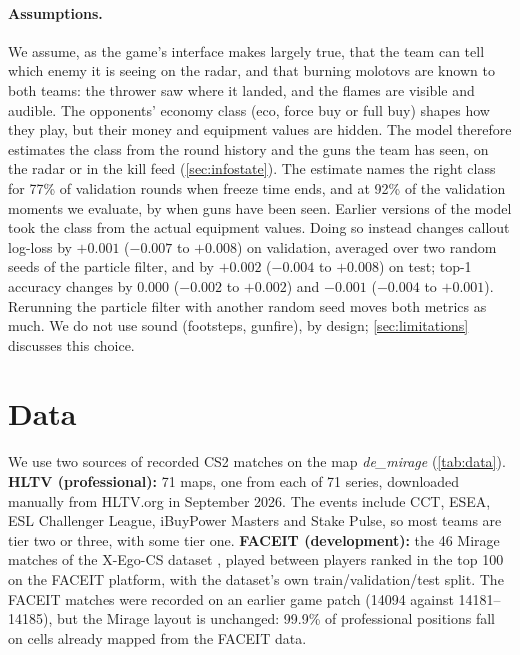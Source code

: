 \documentclass[11pt]{article}
\newcommand{\1}{\mathbb{1}}
\begin{document}
\paragraph{Assumptions.} We assume, as the game's interface makes largely true, that the team can tell which enemy it is seeing on the radar, and that burning molotovs are known to both teams: the thrower saw where it landed, and the flames are visible and audible. The opponents' economy class (eco, force buy or full buy) shapes how they play, but their money and equipment values are hidden. The model therefore estimates the class from the round history and the guns the team has seen, on the radar or in the kill feed (\cref{sec:infostate}). The estimate names the right class for 77\% of validation rounds when freeze time ends, and at 92\% of the validation moments we evaluate, by when guns have been seen. Earlier versions of the model took the class from the actual equipment values. Doing so instead changes callout log-loss by $+0.001$ ($-0.007$ to $+0.008$) on validation, averaged over two random seeds of the particle filter, and by $+0.002$ ($-0.004$ to $+0.008$) on test; top-1 accuracy changes by $0.000$ ($-0.002$ to $+0.002$) and $-0.001$ ($-0.004$ to $+0.001$). Rerunning the particle filter with another random seed moves both metrics as much. We do not use sound (footsteps, gunfire), by design; \cref{sec:limitations} discusses this choice.

\section{Data}
\label{sec:data}

We use two sources of recorded CS2 matches on the map \emph{de\_mirage} (\cref{tab:data}). \textbf{HLTV (professional):} 71 maps, one from each of 71 series, downloaded manually from HLTV.org \citep{hltv} in September 2026. The events include CCT, ESEA, ESL Challenger League, iBuyPower Masters and Stake Pulse, so most teams are tier two or three, with some tier one. \textbf{FACEIT (development):} the 46 Mirage matches of the X-Ego-CS dataset \citep{wang2025xego}, played between players ranked in the top 100 on the FACEIT platform, with the dataset's own train/validation/test split. The FACEIT matches were recorded on an earlier game patch (14094 against 14181--14185), but the Mirage layout is unchanged: 99.9\% of professional positions fall on cells already mapped from the FACEIT data.
\end{document}
